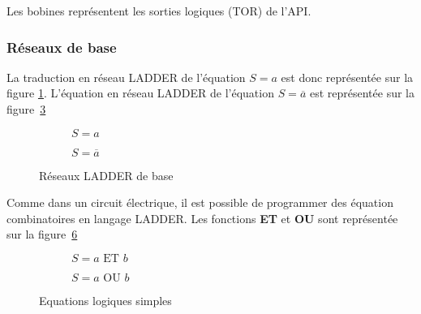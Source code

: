 Les bobines représentent les sorties logiques (TOR) de l'API.



\subsubsection{Réseaux de base}

La traduction en réseau LADDER de l'équation $S = a$ est donc représentée sur la figure \ref{fig:ladAtoS}. L'équation en réseau LADDER de l'équation $S = \overline{a}$ est représentée sur la figure~\ref{fig:ladABartoS}

\begin{figure}[ht]
  \begin{subfigure}[b]{.49\textwidth}
  \centering
    
    \caption{$S = a$}
    \label{fig:ladAtoS}
  \end{subfigure}
  \begin{subfigure}[b]{.49\textwidth}
  \centering
    
    \caption{$S = \overline{a}$}
    \label{fig:ladABartoS}
  \end{subfigure}

  \caption{Réseaux LADDER de base}
\end{figure}

Comme dans un circuit électrique, il est possible de programmer des équation combinatoires en langage LADDER. Les fonctions \textbf{ET} et \textbf{OU} sont représentée sur la figure~\ref{fig:equaLogiques}

\begin{figure}[ht]
  \begin{subfigure}[b]{.49\textwidth}
    \centering
    
    \caption{$S = a \text{ ET } b$}
    \label{fig:aETb}
  \end{subfigure}
  \begin{subfigure}[b]{.49\textwidth}
    \centering
    
    \caption{$S = a \text{ OU } b$}
    \label{fig:aOUb}
  \end{subfigure}
  \caption{Equations logiques simples}
  \label{fig:equaLogiques}
\end{figure}


